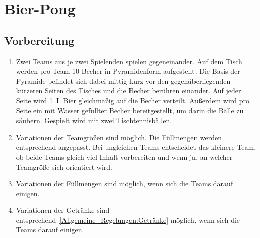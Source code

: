 \chapter{Bier-Pong}
\section{Vorbereitung}
\begin{enumerate}[label={(\arabic*)}]
    \item
    Zwei Teams aus je zwei Spielenden spielen gegeneinander.
    Auf dem Tisch werden pro Team 10 Becher in Pyramidenform aufgestellt.
    Die Basis der Pyramide befindet sich dabei mittig kurz vor den gegenüberliegenden kürzeren Seiten des Tisches und die Becher berühren einander.
    Auf jeder Seite wird \SI{1}{\liter} Bier gleichmäßig auf die Becher verteilt.
    Außerdem wird pro Seite ein mit Wasser gefüllter Becher bereitgestellt, um darin die Bälle zu säubern.
    Gespielt wird mit zwei Tischtennisbällen.

    \item
    Variationen der Teamgrößen sind möglich.
    Die Füllmengen werden entsprechend angepasst.
    Bei ungleichen Teams entscheidet das kleinere Team, ob beide Teams gleich viel Inhalt vorbereiten und wenn ja, an welcher Teamgröße sich orientiert wird.

    \item
    Variationen der Füllmengen sind möglich, wenn sich die Teams darauf einigen.

    \item
    Variationen der Getränke sind entsprechend~\ref{Allgemeine_Regelungen:Getränke} möglich, wenn sich die Teams darauf einigen.
\end{enumerate}

